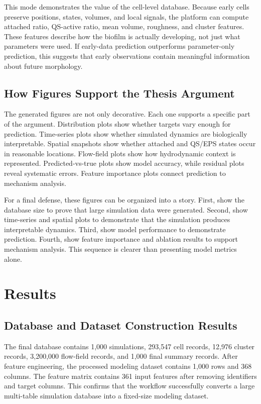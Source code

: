 \documentclass[12pt,a4paper,oneside]{report}
\begin{document}
This mode demonstrates the value of the cell-level database. Because early cells preserve positions, states, volumes, and local signals, the platform can compute attached ratio, QS-active ratio, mean volume, roughness, and cluster features. These features describe how the biofilm is actually developing, not just what parameters were used. If early-data prediction outperforms parameter-only prediction, this suggests that early observations contain meaningful information about future morphology.

\section{How Figures Support the Thesis Argument}
The generated figures are not only decorative. Each one supports a specific part of the argument. Distribution plots show whether targets vary enough for prediction. Time-series plots show whether simulated dynamics are biologically interpretable. Spatial snapshots show whether attached and QS/EPS states occur in reasonable locations. Flow-field plots show how hydrodynamic context is represented. Predicted-vs-true plots show model accuracy, while residual plots reveal systematic errors. Feature importance plots connect prediction to mechanism analysis.

For a final defense, these figures can be organized into a story. First, show the database size to prove that large simulation data were generated. Second, show time-series and spatial plots to demonstrate that the simulation produces interpretable dynamics. Third, show model performance to demonstrate prediction. Fourth, show feature importance and ablation results to support mechanism analysis. This sequence is clearer than presenting model metrics alone.

\chapter{Results}

\section{Database and Dataset Construction Results}
The final database contains 1,000 simulations, 293,547 cell records, 12,976 cluster records, 3,200,000 flow-field records, and 1,000 final summary records. After feature engineering, the processed modeling dataset contains 1,000 rows and 368 columns. The feature matrix contains 361 input features after removing identifiers and target columns. This confirms that the workflow successfully converts a large multi-table simulation database into a fixed-size modeling dataset.
\end{document}
